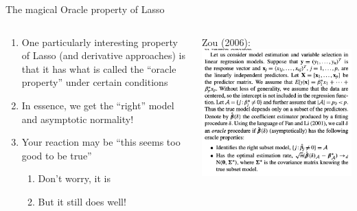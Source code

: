   
  \begin{frame}[allowframebreaks]{The magical Oracle property of Lasso}
    \begin{columns}[T] %
      \begin{column}{.5\textwidth}
    \begin{enumerate}[-]
    \item One particularly interesting property of Lasso (and derivative
      approaches) is that it has what is called the ``oracle property''
      under certain conditions
    \item In essence, we get the ``right'' model and asymptotic
      normality!
    \item Your reaction may be ``this seems too good to be true''
      \begin{enumerate}[-]
      \item Don't worry, it is
      \item But it still does well!
      \end{enumerate}
    \end{enumerate}
      \end{column}%
    \hfill%
    \begin{column}{.5\textwidth}
      Zou (2006):
      \includegraphics[width=\linewidth]{oracle_property.png}
    \end{column}
  \end{columns}
  \end{frame}
  
